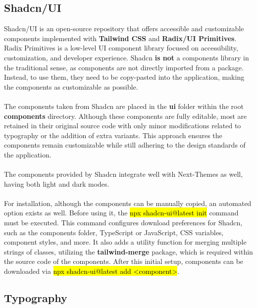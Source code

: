 \subsection{Shadcn/UI}

\noindent Shadcn/UI is an open-source repository that offers accessible and customizable components implemented with \textbf{Tailwind CSS} and \textbf{Radix/UI Primitives}. Radix Primitives is a low-level UI component library focused on accessibility, customization, and developer experience. Shadcn \textbf{is not} a components library in the traditional sense, as components are not directly imported from a package. Instead, to use them, they need to be copy-pasted into the application, making the components as customizable as possible.
\\\\
\noindent The components taken from Shadcn \cite{shadcn-components} are placed in the \textbf{ui} folder within the root \textbf{components} directory. Although these components are fully editable, most are retained in their original source code with only minor modifications related to typography or the addition of extra variants. This approach ensures the components remain customizable while still adhering to the design standards of the application.
\\\\
\noindent The components provided by Shadcn integrate well with Next-Themes as well, having both light and dark modes.
\\\\
\noindent For installation, although the components can be manually copied, an automated option exists as well. Before using it, the \hl{npx shadcn-ui@latest init} command must be executed. This command configures download preferences for Shadcn, such as the components folder, TypeScript or JavaScript, CSS variables, component styles, and more. It also adds a utility function for merging multiple strings of classes, utilizing the \textbf{tailwind-merge} package, which is required within the source code of the components. After this initial setup, components can be downloaded via \hl{npx shadcn-ui@latest add <component>}.

\subsection{Typography}


